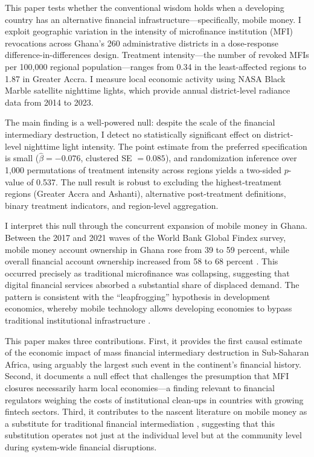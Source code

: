 \documentclass[12pt]{article}
\begin{document}
This paper tests whether the conventional wisdom holds when a developing country has an alternative financial infrastructure---specifically, mobile money. I exploit geographic variation in the intensity of microfinance institution (MFI) revocations across Ghana's 260 administrative districts in a dose-response difference-in-differences design. Treatment intensity---the number of revoked MFIs per 100,000 regional population---ranges from 0.34 in the least-affected regions to 1.87 in Greater Accra. I measure local economic activity using NASA Black Marble satellite nighttime lights, which provide annual district-level radiance data from 2014 to 2023.

The main finding is a well-powered null: despite the scale of the financial intermediary destruction, I detect no statistically significant effect on district-level nighttime light intensity. The point estimate from the preferred specification is small ($\hat{\beta} = -0.076$, clustered SE $= 0.085$), and randomization inference over 1,000 permutations of treatment intensity across regions yields a two-sided $p$-value of 0.537. The null result is robust to excluding the highest-treatment regions (Greater Accra and Ashanti), alternative post-treatment definitions, binary treatment indicators, and region-level aggregation.

I interpret this null through the concurrent expansion of mobile money in Ghana. Between the 2017 and 2021 waves of the World Bank Global Findex survey, mobile money account ownership in Ghana rose from 39 to 59 percent, while overall financial account ownership increased from 58 to 68 percent \citep{Demirguc2022}. This occurred precisely as traditional microfinance was collapsing, suggesting that digital financial services absorbed a substantial share of displaced demand. The pattern is consistent with the ``leapfrogging'' hypothesis in development economics, whereby mobile technology allows developing economies to bypass traditional institutional infrastructure \citep{Jack2011, Suri2017}.

This paper makes three contributions. First, it provides the first causal estimate of the economic impact of mass financial intermediary destruction in Sub-Saharan Africa, using arguably the largest such event in the continent's financial history. Second, it documents a null effect that challenges the presumption that MFI closures necessarily harm local economies---a finding relevant to financial regulators weighing the costs of institutional clean-ups in countries with growing fintech sectors. Third, it contributes to the nascent literature on mobile money as a substitute for traditional financial intermediation \citep{Jack2014, Munyegera2016, Riley2018, Suri2017}, suggesting that this substitution operates not just at the individual level but at the community level during system-wide financial disruptions.
\end{document}
